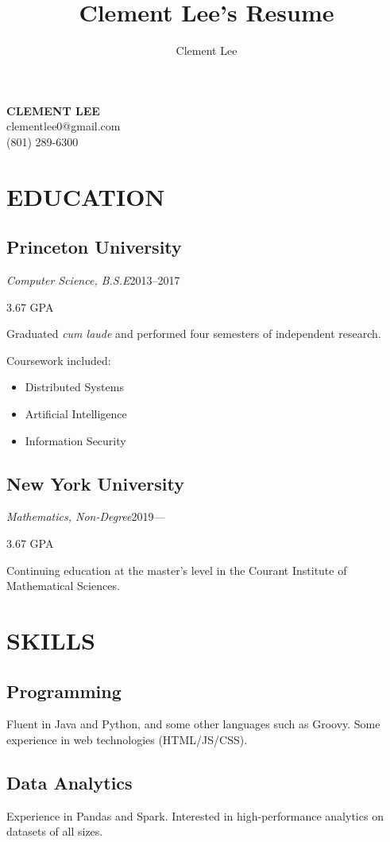 \documentclass[11pt]{article}
\title{Clement Lee's Resume}
\author{Clement Lee}
\date{}
\begin{document}
{\Huge\textbf{CLEMENT LEE}}
\smallskip\\
clementlee0@gmail.com\\
(801) 289-6300\\

\begin{minipage}[t]{0.40\textwidth}
  \section*{\LARGE EDUCATION}
  \subsection*{Princeton University}
  \emph{Computer Science, B.S.E}\hfill 2013--2017
  
  \hfill 3.67 GPA
  \smallskip

  Graduated \emph{cum laude} and performed four semesters of independent research.

  Coursework included:
  \begin{itemize}
    \item Distributed Systems
    \item Artificial Intelligence
    \item Information Security
  \end{itemize}

  \medskip
  \subsection*{New York University}
  \emph{Mathematics, Non-Degree}\hfill2019---

  \hfill 3.67 GPA
  \smallskip
  
  Continuing education at the master's level in the Courant Institute of Mathematical Sciences. 

  \bigskip
  \section*{\LARGE SKILLS}

  \subsection*{Programming}
  Fluent in Java and Python, and some other languages such as Groovy.
  Some experience in web technologies (HTML/JS/CSS).

  \medskip
  \subsection*{Data Analytics}
  Experience in Pandas and Spark.
  Interested in high-performance analytics on datasets of all sizes.


\end{minipage}
\end{document}
